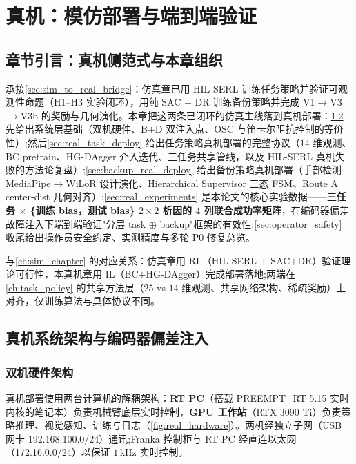 
\chapter{真机：模仿部署与端到端验证}\label{ch:real_chapter}

\section{章节引言：真机侧范式与本章组织}\label{sec:real_intro}

承接\cref{sec:sim_to_real_bridge}：仿真章已用 HIL-SERL 训练任务策略并验证可观测性命题（H1–H3 实验闭环），用纯 SAC $+$ DR 训练备份策略并完成 V1$\to$V3$\to$V3b 的奖励与几何演化。本章把这两条已闭环的仿真主线落到真机部署：\cref{sec:real_arch} 先给出系统层基础（双机硬件、B$+$D 双注入点、OSC 与笛卡尔阻抗控制的等价性）;然后\cref{sec:real_task_deploy} 给出任务策略真机部署的完整协议（$14$ 维观测、BC pretrain、HG-DAgger 介入迭代、三任务共享管线，以及 HIL-SERL 真机失败的方法论复盘）;\cref{sec:backup_real_deploy} 给出备份策略真机部署（手部检测 MediaPipe$\to$WiLoR 设计演化、Hierarchical Supervisor 三态 FSM、Route A center-dist 几何对齐）;\cref{sec:real_experiments} 是本论文的核心实验数据——\textbf{三任务 $\times$ \{训练 bias，测试 bias\} $2\times2$ 析因的 $4$ 列联合成功率矩阵}，在编码器偏差故障注入下端到端验证"分层 task $\oplus$ backup"框架的有效性;\cref{sec:operator_safety} 收尾给出操作员安全约定、实测精度与多轮 P0 修复总览。

与\cref{ch:sim_chapter} 的对应关系：仿真章用 RL（HIL-SERL $+$ SAC$+$DR）验证理论可行性，本真机章用 IL（BC$+$HG-DAgger）完成部署落地;两端在\cref{ch:task_policy} 的共享方法层（$25$ vs $14$ 维观测、共享网络架构、稀疏奖励）上对齐，仅训练算法与具体协议不同。

\section{真机系统架构与编码器偏差注入}\label{sec:real_arch}

\subsection{双机硬件架构}\label{subsec:hardware}

真机部署使用两台计算机的解耦架构：\textbf{RT PC}（搭载 PREEMPT\_RT 5.15 实时内核的笔记本）负责机械臂底层实时控制，\textbf{GPU 工作站}（RTX 3090 Ti）负责策略推理、视觉感知、训练与日志（\cref{fig:real_hardware}）。两机经独立子网（USB 网卡 192.168.100.0/24）通讯;Franka 控制柜与 RT PC 经直连以太网（172.16.0.0/24）以保证 $1$\,kHz 实时控制。

